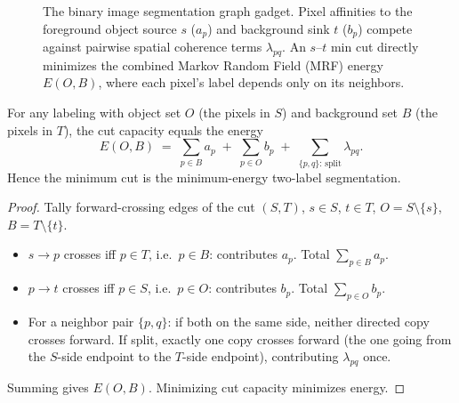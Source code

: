 \begin{figure}[H]
\centering
{}
\caption{The binary image segmentation graph gadget. Pixel affinities to the foreground
object source $s$ ($a_p$) and background sink $t$ ($b_p$) compete against pairwise
spatial coherence terms $\lambda_{pq}$. An $s$--$t$ min cut directly minimizes the
combined Markov Random Field (MRF) energy $E(O, B)$, where each pixel's label depends only on its neighbors.}
\label{ch18:fig-image-seg}
\end{figure}

\begin{theorem}
\label{ch18:thm-seg}
For any labeling with object set $O$ (the pixels in $S$) and background set $B$ (the pixels in $T$), the cut capacity equals the energy
\[
  E(O,B) \;=\; \sum_{p\in B} a_p \;+\; \sum_{p\in O} b_p \;+\; \sum_{\{p,q\}:\, \text{split}} \lambda_{pq}.
\]
Hence the minimum cut is the minimum-energy two-label segmentation.
\end{theorem}

\begin{proof}
Tally forward-crossing edges of the cut $(S,T)$, $s\in S$, $t\in T$, $O=S\setminus\{s\}$, $B=T\setminus\{t\}$.
\begin{itemize}
\item $s\to p$ crosses iff $p\in T$, i.e.\ $p\in B$: contributes $a_p$. Total $\sum_{p\in B} a_p$.
\item $p\to t$ crosses iff $p\in S$, i.e.\ $p\in O$: contributes $b_p$. Total $\sum_{p\in O} b_p$.
\item For a neighbor pair $\{p,q\}$: if both on the same side, neither directed copy crosses forward. If split, exactly one copy crosses forward (the one going from the $S$-side endpoint to the $T$-side endpoint), contributing $\lambda_{pq}$ once.
\end{itemize}
Summing gives $E(O,B)$. Minimizing cut capacity minimizes energy.
\end{proof}

